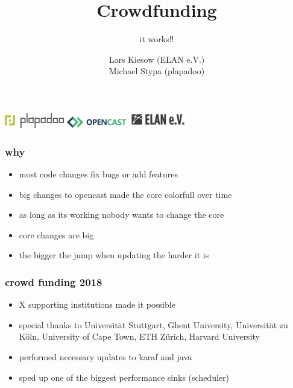 \documentclass[t,aspectratio=169]{beamer}
\title{Crowdfunding}
\subtitle{it works!!}
\author{Lars Kiesow (ELAN e.V.)\\\vspace{1em}Michael Stypa (plapadoo)}
\begin{document}
\begin{frame}
  \titlepage
  \includegraphics[width=7em]{plapadoo.pdf}
  \hfill
  \includegraphics[width=7em]{opencast.pdf}
  \hfill
  \includegraphics[width=7em]{elan.pdf}
\end{frame}

\begin{frame}[c]
  \frametitle{why}
  \begin{itemize}
    \item most code changes fix bugs or add features
    \item big changes to opencast made the core colorfull over time
    \item as long as its working nobody wants to change the core
    \item core changes are big
    \item the bigger the jump when updating the harder it is
  \end{itemize}
\end{frame}

\begin{frame}[c]
  \frametitle{crowd funding 2018}
  \begin{itemize}
    \item X supporting institutions made it possible
    \item special thanks to Universität Stuttgart, Ghent University, Universität zu Köln, University of Cape Town, ETH Zürich, Harvard University
  \end{itemize}
  \begin{itemize}
    \item performed necessary updates to karaf and java
    \item sped up one of the biggest performance sinks (scheduler)
  \end{itemize}
\end{frame}

\end{document}
